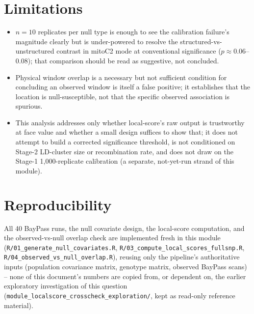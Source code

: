 \documentclass[11pt]{article}
\begin{document}
\section*{\color{Accent}Limitations}
\begin{itemize}
\item $n=10$ replicates per null type is enough to see the calibration failure's magnitude clearly
  but is under-powered to resolve the structured-vs-unstructured contrast in mitoC2 mode at
  conventional significance ($p\approx0.06$--$0.08$); that comparison should be read as suggestive,
  not concluded.
\item Physical window overlap is a necessary but not sufficient condition for concluding an
  observed window is itself a false positive; it establishes that the location is null-susceptible,
  not that the specific observed association is spurious.
\item This analysis addresses only whether local-score's raw output is trustworthy at face value
  and whether a small design suffices to show that; it does not attempt to build a corrected
  significance threshold, is not conditioned on Stage-2 LD-cluster size or recombination rate, and
  does not draw on the Stage-1 1{,}000-replicate calibration (a separate, not-yet-run strand of
  this module).
\end{itemize}

\section*{\color{Accent}Reproducibility}
All 40 BayPass runs, the null covariate design, the local-score computation, and the
observed-vs-null overlap check are implemented fresh in this module
(\texttt{R/01\_generate\_null\_covariates.R}, \texttt{R/03\_compute\_local\_scores\_fullsnp.R},
\texttt{R/04\_observed\_vs\_null\_overlap.R}), reusing only the pipeline's authoritative inputs
(population covariance matrix, genotype matrix, observed BayPass scans) -- none of this document's
numbers are copied from, or dependent on, the earlier exploratory investigation of this question
(\texttt{module\_localscore\_crosscheck\_exploration/}, kept as read-only reference material).
\end{document}
